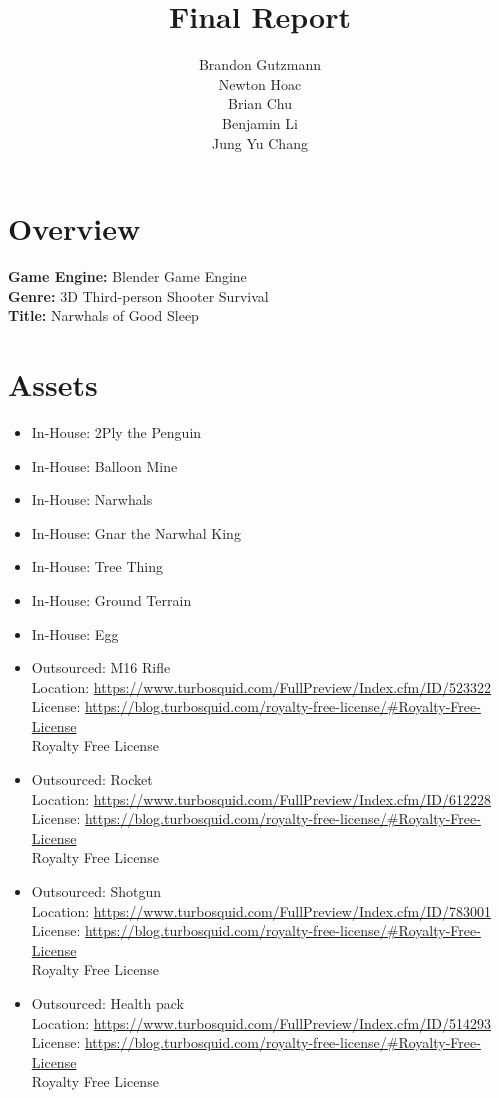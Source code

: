 \documentclass{article}
\title{Final Report}
\author{Brandon Gutzmann\\Newton Hoac\\Brian Chu\\Benjamin Li\\Jung Yu Chang}
\begin{document}
\maketitle
\tableofcontents
\section{Overview}
\textbf{Game Engine:} Blender Game Engine\\
\textbf{Genre:} 3D Third-person Shooter Survival\\
\textbf{Title:} Narwhals of Good Sleep

\section{Assets}
\begin{itemize}
\item In-House: 2Ply the Penguin
\item In-House: Balloon Mine
\item In-House: Narwhals
\item In-House: Gnar the Narwhal King
\item In-House: Tree Thing
\item In-House: Ground Terrain
\item In-House: Egg
\item Outsourced: M16 Rifle\\
	Location: \url{https://www.turbosquid.com/FullPreview/Index.cfm/ID/523322}\\
    License: \url{https://blog.turbosquid.com/royalty-free-license/#Royalty-Free-License}\\
    Royalty Free License
   
\item Outsourced: Rocket\\
	Location: \url{https://www.turbosquid.com/FullPreview/Index.cfm/ID/612228}\\
    License: \url{https://blog.turbosquid.com/royalty-free-license/#Royalty-Free-License}\\
    Royalty Free License
    
\item Outsourced: Shotgun\\
	Location: \url{https://www.turbosquid.com/FullPreview/Index.cfm/ID/783001}
    License: \url{https://blog.turbosquid.com/royalty-free-license/#Royalty-Free-License}\\
    Royalty Free License
    
\item Outsourced: Health pack\\
	Location: \url{https://www.turbosquid.com/FullPreview/Index.cfm/ID/514293}
    License: \url{https://blog.turbosquid.com/royalty-free-license/#Royalty-Free-License}\\
    Royalty Free License
    

\end{itemize}
\end{document}
